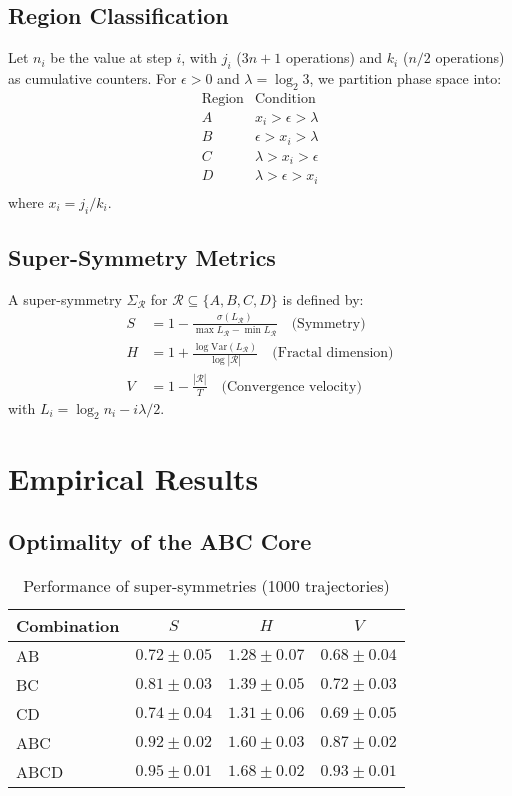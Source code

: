 \documentclass[12pt]{article}
\begin{document}
\subsection{Region Classification}  
Let $n_i$ be the value at step $i$, with $j_i$ ($3n+1$ operations) and $k_i$ ($n/2$ operations) as cumulative counters. For $\epsilon > 0$ and $\lambda = \log_2 3$, we partition phase space into:  
\[  
\begin{array}{c|c}  
\text{Region} & \text{Condition} \\ \hline  
A & x_i > \epsilon > \lambda \\  
B & \epsilon > x_i > \lambda \\  
C & \lambda > x_i > \epsilon \\  
D & \lambda > \epsilon > x_i \\  
\end{array}  
\]  
where $x_i = j_i/k_i$.  

\subsection{Super-Symmetry Metrics}  
A super-symmetry $\Sigma_{\mathcal{R}}$ for $\mathcal{R} \subseteq \{A,B,C,D\}$ is defined by:  
\begin{align*}  
S &= 1 - \frac{\sigma(L_{\mathcal{R}})}{\max L_{\mathcal{R}} - \min L_{\mathcal{R}}} \quad \text{(Symmetry)} \\  
H &= 1 + \frac{\log \mathrm{Var}(L_{\mathcal{R}})}{\log |\mathcal{R}|} \quad \text{(Fractal dimension)} \\  
V &= 1 - \frac{|\mathcal{R}|}{T} \quad \text{(Convergence velocity)}  
\end{align*}  
with $L_i = \log_2 n_i - i \lambda/2$.  

\section{Empirical Results}  

\subsection{Optimality of the ABC Core}  
\begin{table}[h]  
\centering  
\caption{Performance of super-symmetries (1000 trajectories)}  
\begin{tabular}{lccc}  
\toprule  
Combination & $S$ & $H$ & $V$ \\  
\midrule  
AB & $0.72 \pm 0.05$ & $1.28 \pm 0.07$ & $0.68 \pm 0.04$ \\  
BC & $0.81 \pm 0.03$ & $1.39 \pm 0.05$ & $0.72 \pm 0.03$ \\  
CD & $0.74 \pm 0.04$ & $1.31 \pm 0.06$ & $0.69 \pm 0.05$ \\  
ABC & $\mathbf{0.92 \pm 0.02}$ & $\mathbf{1.60 \pm 0.03}$ & $\mathbf{0.87 \pm 0.02}$ \\  
ABCD & $0.95 \pm 0.01$ & $1.68 \pm 0.02$ & $0.93 \pm 0.01$ \\  
\bottomrule  
\end{tabular}  
\end{table}  
\end{document}
